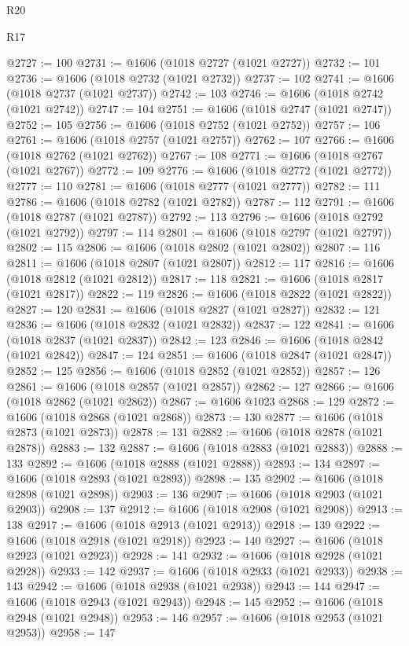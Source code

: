 \begin{lexlean}{R20}
\begin{lexlean}{R17}
\begin{coremodule}
{{{{{{{{{{{{{{{{{{{{{{{{{{{{{{{{{{{{{{{{{{{{{{{{{{{{{{{{{{{{{{{{{{{{{{{{{{{{{{{{{{{{{{{{{{{{{{{{{{{{{{{{{{{@2727 := 100
@2731 := @1606 (@1018 @2727 (@1021 @2727))
@2732 := 101
@2736 := @1606 (@1018 @2732 (@1021 @2732))
@2737 := 102
@2741 := @1606 (@1018 @2737 (@1021 @2737))
@2742 := 103
@2746 := @1606 (@1018 @2742 (@1021 @2742))
@2747 := 104
@2751 := @1606 (@1018 @2747 (@1021 @2747))
@2752 := 105
@2756 := @1606 (@1018 @2752 (@1021 @2752))
@2757 := 106
@2761 := @1606 (@1018 @2757 (@1021 @2757))
@2762 := 107
@2766 := @1606 (@1018 @2762 (@1021 @2762))
@2767 := 108
@2771 := @1606 (@1018 @2767 (@1021 @2767))
@2772 := 109
@2776 := @1606 (@1018 @2772 (@1021 @2772))
@2777 := 110
@2781 := @1606 (@1018 @2777 (@1021 @2777))
@2782 := 111
@2786 := @1606 (@1018 @2782 (@1021 @2782))
@2787 := 112
@2791 := @1606 (@1018 @2787 (@1021 @2787))
@2792 := 113
@2796 := @1606 (@1018 @2792 (@1021 @2792))
@2797 := 114
@2801 := @1606 (@1018 @2797 (@1021 @2797))
@2802 := 115
@2806 := @1606 (@1018 @2802 (@1021 @2802))
@2807 := 116
@2811 := @1606 (@1018 @2807 (@1021 @2807))
@2812 := 117
@2816 := @1606 (@1018 @2812 (@1021 @2812))
@2817 := 118
@2821 := @1606 (@1018 @2817 (@1021 @2817))
@2822 := 119
@2826 := @1606 (@1018 @2822 (@1021 @2822))
@2827 := 120
@2831 := @1606 (@1018 @2827 (@1021 @2827))
@2832 := 121
@2836 := @1606 (@1018 @2832 (@1021 @2832))
@2837 := 122
@2841 := @1606 (@1018 @2837 (@1021 @2837))
@2842 := 123
@2846 := @1606 (@1018 @2842 (@1021 @2842))
@2847 := 124
@2851 := @1606 (@1018 @2847 (@1021 @2847))
@2852 := 125
@2856 := @1606 (@1018 @2852 (@1021 @2852))
@2857 := 126
@2861 := @1606 (@1018 @2857 (@1021 @2857))
@2862 := 127
@2866 := @1606 (@1018 @2862 (@1021 @2862))
@2867 := @1606 @1023
@2868 := 129
@2872 := @1606 (@1018 @2868 (@1021 @2868))
@2873 := 130
@2877 := @1606 (@1018 @2873 (@1021 @2873))
@2878 := 131
@2882 := @1606 (@1018 @2878 (@1021 @2878))
@2883 := 132
@2887 := @1606 (@1018 @2883 (@1021 @2883))
@2888 := 133
@2892 := @1606 (@1018 @2888 (@1021 @2888))
@2893 := 134
@2897 := @1606 (@1018 @2893 (@1021 @2893))
@2898 := 135
@2902 := @1606 (@1018 @2898 (@1021 @2898))
@2903 := 136
@2907 := @1606 (@1018 @2903 (@1021 @2903))
@2908 := 137
@2912 := @1606 (@1018 @2908 (@1021 @2908))
@2913 := 138
@2917 := @1606 (@1018 @2913 (@1021 @2913))
@2918 := 139
@2922 := @1606 (@1018 @2918 (@1021 @2918))
@2923 := 140
@2927 := @1606 (@1018 @2923 (@1021 @2923))
@2928 := 141
@2932 := @1606 (@1018 @2928 (@1021 @2928))
@2933 := 142
@2937 := @1606 (@1018 @2933 (@1021 @2933))
@2938 := 143
@2942 := @1606 (@1018 @2938 (@1021 @2938))
@2943 := 144
@2947 := @1606 (@1018 @2943 (@1021 @2943))
@2948 := 145
@2952 := @1606 (@1018 @2948 (@1021 @2948))
@2953 := 146
@2957 := @1606 (@1018 @2953 (@1021 @2953))
@2958 := 147
}}}}}}}}}}}}}}}}}}}}}}}}}}}}}}}}}}}}}}}}}}}}}}}}}}}}}}}}}}}}}}}}}}}}}}}}}}}}}}}}}}}}}}}}}}}}}}}}}}}}}}}}}}}
\end{coremodule}
\end{lexlean}
\end{lexlean}
